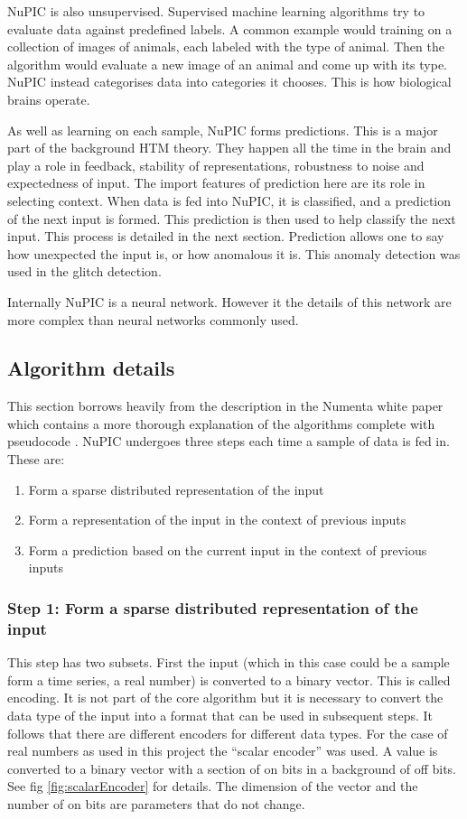 \documentclass[a4paper]{jpconf}
\begin{document}
		NuPIC is also unsupervised. Supervised machine learning algorithms try to evaluate data against predefined labels. A common example would training on a collection of images of animals, each labeled with the type of animal. Then the algorithm would evaluate a new image of an animal and come up with its type. NuPIC instead categorises data into categories it chooses. This is how biological brains operate.
		
		As well as learning on each sample, NuPIC forms predictions. This is a major part of the background HTM theory. They happen all the time in the brain and play a role in feedback, stability of representations, robustness to noise and expectedness of input. The import features of prediction here are its role in selecting context. When data is fed into NuPIC, it is classified, and a prediction of the next input is formed. This prediction is then used to help classify the next input. This process is detailed in the next section. Prediction allows one to say how unexpected the input is, or how anomalous it is. This anomaly detection was used in the glitch detection.
		
		Internally NuPIC is a neural network. However it the details of this network are more complex than neural networks commonly used.
		
	\subsection{Algorithm details}
		This section borrows heavily from the description in the Numenta white paper which contains a more thorough explanation of the algorithms complete with pseudocode \cite{htmWhitePaper}. NuPIC undergoes three steps each time a sample of data is fed in. These are:
		\begin{enumerate}
			\item Form a sparse distributed representation of the input
			\item Form a representation of the input in the context of previous inputs
			\item Form a prediction based on the current input in the context of previous inputs
		\end{enumerate}
		
		\subsubsection{Step 1: Form a sparse distributed representation of the input}
			This step has two subsets. First the input (which in this case could be a sample form a time series, a real number) is converted to a binary vector. This is called encoding. It is not part of the core algorithm but it is necessary to convert the data type of the input into a format that can be used in subsequent steps. It follows that there are different encoders for different data types. For the case of real numbers as used in this project the ``scalar encoder'' was used. A value is converted to a binary vector with a section of on bits in a background of off bits. See fig \ref{fig:scalarEncoder} for details. The dimension of the vector and the number of on bits are parameters that do not change.
			
\end{document}
